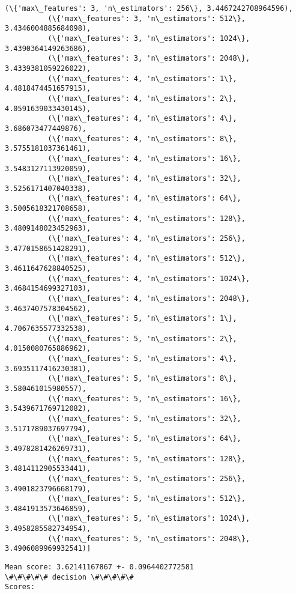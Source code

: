 \documentclass[11pt]{article}
\begin{document}
\begin{Verbatim}[commandchars=\\\{\}]
          (\{'max\_features': 3, 'n\_estimators': 256\}, 3.4467242708964596),
          (\{'max\_features': 3, 'n\_estimators': 512\}, 3.4346004885684098),
          (\{'max\_features': 3, 'n\_estimators': 1024\}, 3.4390364149263686),
          (\{'max\_features': 3, 'n\_estimators': 2048\}, 3.4339381059226022),
          (\{'max\_features': 4, 'n\_estimators': 1\}, 4.4818474451657915),
          (\{'max\_features': 4, 'n\_estimators': 2\}, 4.0591639033430145),
          (\{'max\_features': 4, 'n\_estimators': 4\}, 3.686073477449876),
          (\{'max\_features': 4, 'n\_estimators': 8\}, 3.5755181037361461),
          (\{'max\_features': 4, 'n\_estimators': 16\}, 3.5483127113920059),
          (\{'max\_features': 4, 'n\_estimators': 32\}, 3.5256171407040338),
          (\{'max\_features': 4, 'n\_estimators': 64\}, 3.5005618321708658),
          (\{'max\_features': 4, 'n\_estimators': 128\}, 3.4809148023452963),
          (\{'max\_features': 4, 'n\_estimators': 256\}, 3.4770158651428291),
          (\{'max\_features': 4, 'n\_estimators': 512\}, 3.4611647628840525),
          (\{'max\_features': 4, 'n\_estimators': 1024\}, 3.4684154699327103),
          (\{'max\_features': 4, 'n\_estimators': 2048\}, 3.4637407578304562),
          (\{'max\_features': 5, 'n\_estimators': 1\}, 4.7067635577332538),
          (\{'max\_features': 5, 'n\_estimators': 2\}, 4.0150080765886962),
          (\{'max\_features': 5, 'n\_estimators': 4\}, 3.6935117416230381),
          (\{'max\_features': 5, 'n\_estimators': 8\}, 3.580461015980557),
          (\{'max\_features': 5, 'n\_estimators': 16\}, 3.5439671769712082),
          (\{'max\_features': 5, 'n\_estimators': 32\}, 3.5171789037697794),
          (\{'max\_features': 5, 'n\_estimators': 64\}, 3.4978281426269731),
          (\{'max\_features': 5, 'n\_estimators': 128\}, 3.4814112905533441),
          (\{'max\_features': 5, 'n\_estimators': 256\}, 3.4901823796668179),
          (\{'max\_features': 5, 'n\_estimators': 512\}, 3.4841913573646859),
          (\{'max\_features': 5, 'n\_estimators': 1024\}, 3.4958285582734954),
          (\{'max\_features': 5, 'n\_estimators': 2048\}, 3.4906089969932541)]
\end{Verbatim}
        
    \begin{Verbatim}[commandchars=\\\{\}]
Mean score: 3.62141167867 +- 0.0964402772581
\#\#\#\#\# decision \#\#\#\#\#
Scores:

    \end{Verbatim}
\end{document}
